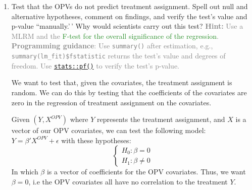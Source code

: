 \documentclass[
]{article}
\begin{document}
\begin{enumerate}
\def\labelenumi{\arabic{enumi}.}
\setcounter{enumi}{2}
\item
  Test that the OPVs do not predict treatment assignment. Spell out null
  and alternative hypotheses, comment on findings, and verify the test's
  value and p-value ``manually.'\,' Why would scientists carry out this
  test?
  \textcolor{gray}{\textbf{Hint:} Use a MLRM and the \textcolor{ForestGreen}{F-test for the overall significance of the regression}. \textbf{Programming guidance}: Use \texttt{summary()} after estimation, e.g., \texttt{summary(lm\_fit)\$fstatistic} returns the test's value and degrees of freedom. Use \href{https://stat.ethz.ch/R-manual/R-devel/library/stats/html/Fdist.html}{\texttt{stats::pf()}} to verify the test's p-value.}

  We want to test that, given the covariates, the treatment assignment
  is random. We can do this by testing that the coefficients of the
  covariates are zero in the regression of treatment assignment on the
  covariates. \newline

  Given \((Y, X^{OPV})\) where \(Y\) represents the treatment
  assignment, and \(X\) is a vector of our OPV covariates, we can test
  the following model: \(Y = \beta'X^{OPV} + \epsilon\) with these
  hypotheses: \newline  \[ 
   \begin{cases}
   H_0: \beta = 0 \\
   H_1: \beta \neq 0 
   \end{cases}
   \] In which \(\beta\) is a vector of coefficients for the OPV
  covariates. Thus, we want \(\beta = 0\), i.e the OPV covariates all
  have no correlation to the treatment \(Y\).
\end{enumerate}
\end{document}

